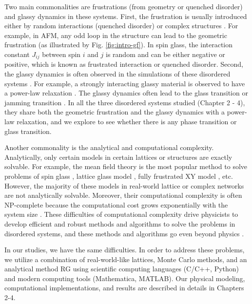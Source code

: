 Two main commonalities are frustrations (from geometry or quenched disorder) and glassy dynamics  in these systems. First, the frustration is usually introduced either by  random interactions (quenched disorder) or complex structures \cite{vannimenus1977}. For example, in AFM, any odd loop in the structure can lead to the geometric frustration \cite{wannier1950afm} (as illustrated by Fig. \ref{fig:intro-gf}). In spin glass, the interaction constant $J_{ij}$ between spin $i$ and $j$ is random and can be either negative or positive, which is known as frustrated interaction \cite{edwards1975theory} or quenched disorder.
Second, the glassy dynamics is often observed in the simulations of these disordered systems \cite{lunkenheimer2000}. For example, a strongly interacting glassy material is observed to have a power-law relaxation \cite{palmer1984}. The glassy dynamics often lead to the glass transition \cite{biroli2013perspective} or jamming transition \cite{Liu1998}. 
In all the three disordered systems studied (Chapter 2 - 4), they share both the geometric frustration and the glassy dynamics with a power-law relaxation, and we explore to see whether there is any phase transition or glass transition.

Another commonality is the analytical and computational complexity. Analytically, only certain models in certain lattices or structures are exactly solvable. For example, the mean field theory  \cite{kadanoff2009} is the most popular method to solve problems of spin glass \cite{sherrington1975}, lattice glass model \cite{Biroli02}, fully frustrated XY model \cite{kim2001xy}, etc. However, the majority of these models in real-world lattice or complex networks are not analytically solvable. Moreover, their computational complexity is often NP-complete \cite{garey1983} because the computational cost grows exponentially with the system size \cite{barahona1982, weigt2000}. These difficulties of computational complexity drive physicists to develop efficient and robust methods and algorithms to solve the problems in disordered systems, and these methods and algorithms go even beyond physics  \cite{mezard1990spin, stein2013spin}.

In our studies, we have the same difficulties. In order to address these problems, we utilize a combination \cite{cheng2015jamming, ma2016prb} of real-world-like lattices, Monte Carlo methods, and an analytical method RG using scientific computing languages (C/C++, Python) and modern computing tools (Mathematica, MATLAB). Our physical modeling, computational implementations, and results are described in details in Chapters 2-4.



